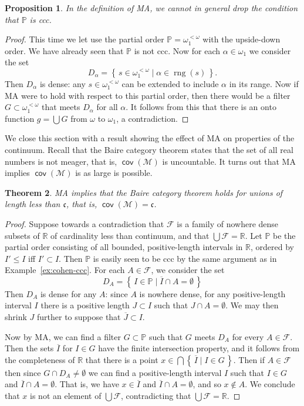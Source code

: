 \documentclass[11pt,oneside]{amsbook}
\newcommand{\set}[1]{\left\{\,#1\,\right\}}
\newcommand{\PP}{\mathbb P}
\newcommand{\RR}{\mathbb R}
\newcommand{\Meager}{\mathcal M}
\DeclareMathOperator{\cov}{\mathsf{cov}}
\DeclareMathOperator{\rng}{rng}
\theoremstyle{definition}
\theoremstyle{plain}
\newtheorem{thm}{Theorem}[section]
\newtheorem{prop}[thm]{Proposition}
\theoremstyle{definition}
\theoremstyle{remark}
\begin{document}
\begin{prop}
  In the definition of MA, we cannot in general drop the condition that $\PP$ is ccc.
\end{prop}

\begin{proof}
  This time we let use the partial order $\PP=\omega_1^{<\omega}$ with the upside-down order. We have already seen that $\PP$ is not ccc. Now for each $\alpha\in\omega_1$ we consider the set
  \[D_\alpha=\set{s\in\omega_1^{<\omega}\mid\alpha\in\rng(s)}\text{.}
  \]
  Then $D_\alpha$ is dense: any $s\in\omega_1^{<\omega}$ can be extended to include $\alpha$ in its range. Now if MA were to hold with respect to this partial order, then there would be a filter $G\subset\omega_1^{<\omega}$ that meets $D_\alpha$ for all $\alpha$. It follows from this that there is an onto function $g=\bigcup G$ from $\omega$ to $\omega_1$, a contradiction.
\end{proof}

We close this section with a result showing the effect of MA on properties of the continuum. Recall that the Baire category theorem states that the set of all real numbers is not meager, that is, $\cov(\Meager)$ is uncountable. It turns out that MA implies $\cov(\Meager)$ is as large is possible.

\begin{thm}
  \label{thm:ma-covm}
  MA implies that the Baire category theorem holds for unions of length less than $\mathfrak c$, that is, $\cov(\Meager)=\mathfrak c$.
\end{thm}

\begin{proof}
  Suppose towards a contradiction that $\mathcal F$ is a family of nowhere dense subsets of $\RR$ of cardinality less than continuum, and that $\bigcup\mathcal F=\RR$. Let $\PP$ be the partial order consisting of all bounded, positive-length intervals in $\RR$, ordered by $I'\leq I$ iff $I'\subset I$. Then $\PP$ is easily seen to be ccc by the same argument as in Example~\ref{ex:cohen-ccc}. For each $A\in\mathcal F$, we consider the set
  \[D_A=\set{I\in\PP\mid \overline{I}\cap A=\emptyset}
  \]
  Then $D_A$ is dense for any $A$: since $A$ is nowhere dense, for any positive-length interval $I$ there is a positive length $J\subset I$ such that $J\cap A=\emptyset$. We may then shrink $J$ further to suppose that $\overline{J}\subset I$.

  Now by MA, we can find a filter $G\subset\PP$ such that $G$ meets $D_A$ for every $A\in\mathcal F$. Then the sets $\overline{I}$ for $I\in G$ have the finite intersection property, and it follows from the completeness of $\RR$ that there is a point $x\in\bigcap\set{\overline{I}\mid I\in G}$. Then if $A\in\mathcal F$ then since $G\cap D_A\neq\emptyset$ we can find a positive-length interval $I$ such that $I\in G$ and $\overline{I}\cap A=\emptyset$. That is, we have $x\in\overline{I}$ and $\overline{I}\cap A=\emptyset$, and so $x\notin A$. We conclude that $x$ is not an element of $\bigcup\mathcal F$, contradicting that $\bigcup\mathcal F=\RR$.
\end{proof}
\end{document}
